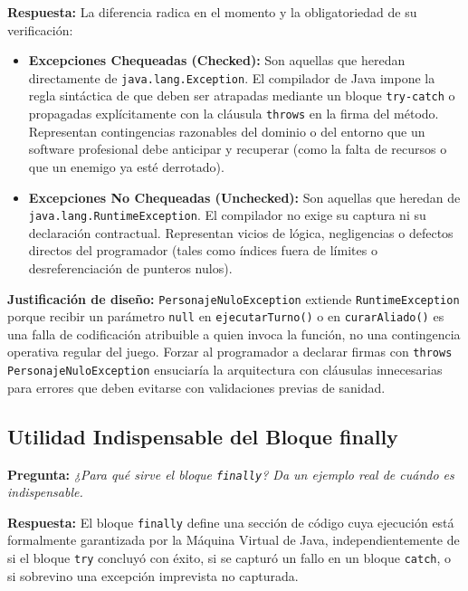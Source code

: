 \documentclass[11pt,letterpaper]{article}
\begin{document}
\vspace{0.2cm}
\noindent \textbf{Respuesta:}
La diferencia radica en el momento y la obligatoriedad de su verificación:
\begin{itemize}
    \item \textbf{Excepciones Chequeadas (Checked):} Son aquellas que heredan directamente de \texttt{java.lang.Exception}. El compilador de Java impone la regla sintáctica de que deben ser atrapadas mediante un bloque \texttt{try-catch} o propagadas explícitamente con la cláusula \texttt{throws} en la firma del método. Representan contingencias razonables del dominio o del entorno que un software profesional debe anticipar y recuperar (como la falta de recursos o que un enemigo ya esté derrotado).
    \item \textbf{Excepciones No Chequeadas (Unchecked):} Son aquellas que heredan de \texttt{java.lang.RuntimeException}. El compilador no exige su captura ni su declaración contractual. Representan vicios de lógica, negligencias o defectos directos del programador (tales como índices fuera de límites o desreferenciación de punteros nulos).
\end{itemize}

\textbf{Justificación de diseño:} \texttt{PersonajeNuloException} extiende \texttt{RuntimeException} porque recibir un parámetro \texttt{null} en \texttt{ejecutarTurno()} o en \texttt{curarAliado()} es una falla de codificación atribuible a quien invoca la función, no una contingencia operativa regular del juego. Forzar al programador a declarar firmas con \texttt{throws PersonajeNuloException} ensuciaría la arquitectura con cláusulas innecesarias para errores que deben evitarse con validaciones previas de sanidad.

\subsection{Utilidad Indispensable del Bloque finally}
\textbf{Pregunta:} \textit{¿Para qué sirve el bloque \texttt{finally}? Da un ejemplo real de cuándo es indispensable.}

\vspace{0.2cm}
\noindent \textbf{Respuesta:}
El bloque \texttt{finally} define una sección de código cuya ejecución está formalmente garantizada por la Máquina Virtual de Java, independientemente de si el bloque \texttt{try} concluyó con éxito, si se capturó un fallo en un bloque \texttt{catch}, o si sobrevino una excepción imprevista no capturada.
\end{document}
